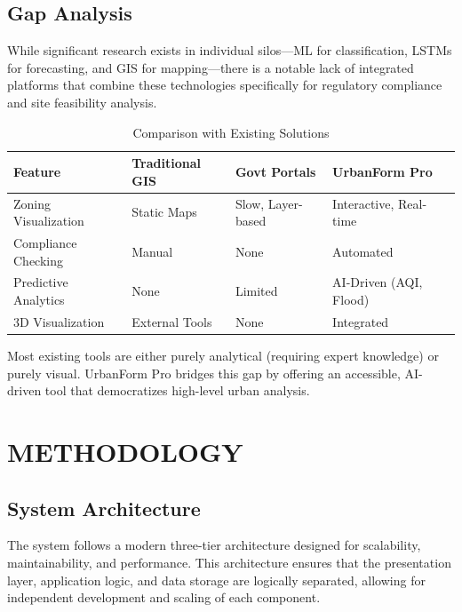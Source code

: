\documentclass[12pt,a4paper]{report}
\begin{document}
\section{Gap Analysis}
While significant research exists in individual silos—ML for classification, LSTMs for forecasting, and GIS for mapping—there is a notable lack of integrated platforms that combine these technologies specifically for regulatory compliance and site feasibility analysis. 
\begin{table}[h]
    \centering
    \begin{tabular}{|p{4cm}|p{3cm}|p{3cm}|p{4cm}|}
        \hline
        \textbf{Feature} & \textbf{Traditional GIS} & \textbf{Govt Portals} & \textbf{UrbanForm Pro} \\
        \hline
        Zoning Visualization & Static Maps & Slow, Layer-based & Interactive, Real-time \\
        \hline
        Compliance Checking & Manual & None & Automated \\
        \hline
        Predictive Analytics & None & Limited & AI-Driven (AQI, Flood) \\
        \hline
        3D Visualization & External Tools & None & Integrated \\
        \hline
    \end{tabular}
    \caption{Comparison with Existing Solutions}
    \label{tab:gap-analysis}
\end{table}

Most existing tools are either purely analytical (requiring expert knowledge) or purely visual. UrbanForm Pro bridges this gap by offering an accessible, AI-driven tool that democratizes high-level urban analysis.

\chapter{METHODOLOGY}

\section{System Architecture}
The system follows a modern three-tier architecture designed for scalability, maintainability, and performance. This architecture ensures that the presentation layer, application logic, and data storage are logically separated, allowing for independent development and scaling of each component.
\end{document}
